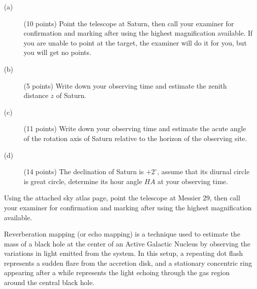 \begin{description}
\item[(a)] (10 points) Point the telescope at Saturn, then call your examiner
  for confirmation and marking after using the highest magnification
  available. If you are unable to point at the target, the examiner will do it
  for you, but you will get no points.
\item[(b)] (5 points) Write down your observing time and estimate the zenith
  distance $z$ of Saturn.
\item[(c)] (11 points) Write down your observing time and estimate the acute
  angle of the rotation axis of Saturn relative to the horizon of the
  observing site.
\item[(d)] (14 points) The declination of Saturn is $+2^\circ$, assume that
  its diurnal circle is great circle, determine its hour angle $HA$ at your
  observing time.
\end{description}

Using the attached sky atlas page, point the telescope at Messier 29, then
call your examiner for confirmation and marking after using the highest
magnification available.


Reverberation mapping (or echo mapping) is a technique used to estimate the
mass of a black hole at the center of an Active Galactic Nucleus by observing
the variations in light emitted from the system. In this setup, a repeating
dot flash represents a sudden flare from the accretion disk, and a stationary
concentric ring appearing after a while represents the light echoing through
the gas region around the central black hole.

